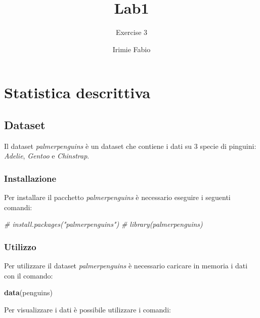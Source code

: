 \documentclass[
]{article}
\title{Lab1}
\subtitle{Exercise 3}
\author{Irimie Fabio}
\date{}
\newenvironment{Shaded}{\begin{snugshade}}{\end{snugshade}}
\newcommand{\CommentTok}[1]{\textcolor[rgb]{0.56,0.35,0.01}{\textit{#1}}}
\newcommand{\FunctionTok}[1]{\textcolor[rgb]{0.13,0.29,0.53}{\textbf{#1}}}
\newcommand{\NormalTok}[1]{#1}
\begin{document}
\maketitle

{
\setcounter{tocdepth}{2}
\tableofcontents
}
\hypertarget{statistica-descrittiva}{%
\section{Statistica descrittiva}\label{statistica-descrittiva}}

\hypertarget{dataset}{%
\subsection{Dataset}\label{dataset}}

Il dataset \emph{palmerpenguins} è un dataset che contiene i dati su 3
specie di pinguini: \emph{Adelie}, \emph{Gentoo} e \emph{Chinstrap}.

\hypertarget{installazione}{%
\subsubsection{Installazione}\label{installazione}}

Per installare il pacchetto \emph{palmerpenguins} è necessario eseguire
i seguenti comandi:

\begin{Shaded}
\begin{Highlighting}[]
\CommentTok{\# install.packages("palmerpenguins")}
\CommentTok{\# library(palmerpenguins)}
\end{Highlighting}
\end{Shaded}

\hypertarget{utilizzo}{%
\subsubsection{Utilizzo}\label{utilizzo}}

Per utilizzare il dataset \emph{palmerpenguins} è necessario caricare in
memoria i dati con il comando:

\begin{Shaded}
\begin{Highlighting}[]
\FunctionTok{data}\NormalTok{(penguins)}
\end{Highlighting}
\end{Shaded}

Per visualizzare i dati è possibile utilizzare i comandi:
\end{document}
